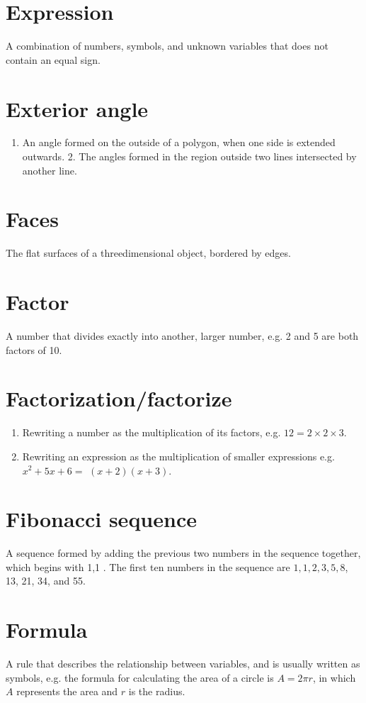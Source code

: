 \documentclass[10pt]{article}
\begin{document}
\section*{Expression}
A combination of numbers, symbols, and unknown variables that does not contain an equal sign.

\section*{Exterior angle}
\begin{enumerate}
  \item An angle formed on the outside of a polygon, when one side is extended outwards. 2. The angles formed in the region outside two lines intersected by another line.
\end{enumerate}

\section*{Faces}
The flat surfaces of a threedimensional object, bordered by edges.

\section*{Factor}
A number that divides exactly into another, larger number, e.g. 2 and 5 are both factors of 10.

\section*{Factorization/factorize}
\begin{enumerate}
  \item Rewriting a number as the multiplication of its factors, e.g. $12=2 \times 2 \times 3$.
  \item Rewriting an expression as the multiplication of smaller expressions e.g. $x^{2}+5 x+6=$ $(x+2)(x+3)$.
\end{enumerate}

\section*{Fibonacci sequence}
A sequence formed by adding the previous two numbers in the sequence together, which begins with 1,1 . The first ten numbers in the sequence are $1,1,2,3,5,8$, 13, 21, 34, and 55.

\section*{Formula}
A rule that describes the relationship between variables, and is usually written as symbols, e.g. the formula for calculating the area of a circle is $A=2 \pi r$, in which $A$ represents the area and $r$ is the radius.
\end{document}
